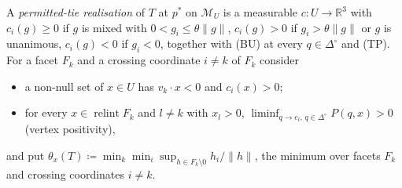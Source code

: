 \documentclass[11pt]{article}
\theoremstyle{definition}
\theoremstyle{remark}
\newcommand{\R}{\mathbb R}
\newcommand{\Di}{\Delta^{\circ}}
\newcommand{\M}{\mathcal M}
\newcommand{\relint}{\operatorname{relint}}
\begin{document}
A \emph{permitted-tie realisation} of $T$ at $p^*$ on $\M_U$ is a measurable $c:U\to\R^3$ with $c_i(g)\ge0$ if $g$ is mixed with $0<g_i\le\theta\|g\|$, $c_i(g)>0$ if $g_i>\theta\|g\|$ or $g$ is unanimous, $c_i(g)<0$ if $g_i<0$, together with (BU) at every $q\in\Di$ and (TP). For a facet $F_k$ and a crossing coordinate $i\ne k$ of $F_k$ consider
\begin{itemize}[leftmargin=*]
\item[\textbf{(X$_{ik}$)}] a non-null set of $x\in U$ has $v_k\cdot x<0$ and $c_i(x)>0$;
\item[\textbf{(VP)}] for every $x\in\relint F_k$ and $l\ne k$ with $x_l>0$, $\liminf_{q\to e_l,\,q\in\Di}P(q,x)>0$ (vertex positivity),
\end{itemize}
and put $\theta_x(T)\coloneqq\min_k\min_{i}\sup_{h\in F_k\setminus0}h_i/\|h\|$, the minimum over facets $F_k$ and crossing coordinates $i\ne k$.
\end{document}
